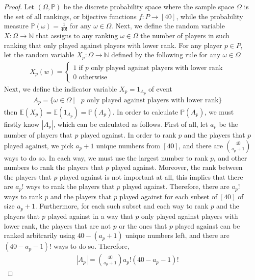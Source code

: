 \begin{proof}
  Let $(\Omega, \mathbb{P})$ be the discrete probability space where the sample space $\Omega$ is the set of all rankings, or bijective functions $f : P \to [40]$, while the probability measure $\mathbb{P}(\omega) = \frac{1}{40!}$ for any $\omega \in \Omega$. Next, we define the random variable $X : \Omega \to \mathbb{N}$ that assigns to any ranking $\omega \in \Omega$ the number of players in such ranking that only played against players with lower rank. For any player $p \in P$, let the random variable $X_{p} : \Omega \to \mathbb{N}$ defined by the following rule for any $\omega \in \Omega$
  \begin{align*}
    X_{p}(w) = 
    \begin{cases}
      1 \text{ if $p$ only played against players with lower rank} \\
      0 \text{ otherwise}
    \end{cases}
  \end{align*}
  Next, we define the indicator variable $X_{p} = 1_{A_{p}}$ of event
  \begin{align*}
    A_{p} = \{ \omega \in \Omega \ | \ \text{ $p$ only played against players with lower rank} \}   
  \end{align*}
  then $\mathbb{E}(X_{p}) = \mathbb{E}(1_{A_{p}}) = \mathbb{P}(A_{p})$. In order to calculate $\mathbb{P}(A_{p})$, we must firstly know $|A_{p}|$, which can be calculated as follows. First of all, let $a_{p}$ be the number of players that $p$ played against. In order to rank $p$ and the players that $p$ played against, we pick $a_{p} + 1$ unique numbers from $[40]$, and there are $\binom{40}{a_{p} + 1}$ ways to do so. In each way, we must use the largest number to rank $p$, and other numbers to rank the players that $p$ played against. Moreover, the rank between the players that $p$ played against is not important at all, this implies that there are $a_{p}!$ ways to rank the players that $p$ played against. Therefore, there are $a_{p}!$ ways to rank $p$ and the players that $p$ played against for each subset of $[40]$ of size $a_{p} + 1$. Furthermore, for each such subset and each way to rank $p$ and the players that $p$ played against in a way that $p$ only played against players with lower rank, the players that are not $p$ or the ones that $p$ played against can be ranked arbitrarily using $40 - (a_{p} + 1)$ unique numbers left, and there are $(40 - a_{p} - 1)!$ ways to do so. Therefore,
  \begin{align*}
    |A_{p}| = \binom{40}{a_{p} + 1} a_{p}! (40 - a_{p} - 1)!
  \end{align*}

\end{proof}
